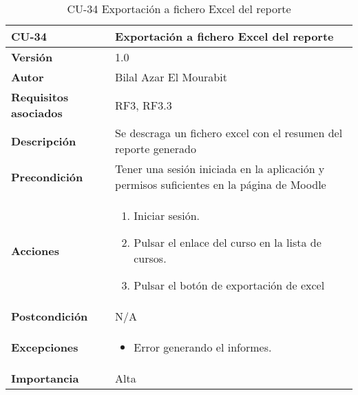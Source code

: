\begin{table}[H]
	\centering
	\begin{tabularx}{\linewidth}{ p{} p{} }
		\toprule
		\textbf{CU-34}    & \textbf{Exportación a fichero Excel del reporte}\\
		\toprule
		\textbf{Versión}              & 1.0    \\
		\textbf{Autor}                & Bilal Azar El Mourabit \\
		\textbf{Requisitos asociados} & RF3, RF3.3\\
		\textbf{Descripción}          & Se descraga un fichero excel con el resumen del reporte generado\\
    		\textbf{Precondición}         & Tener una sesión iniciada en la aplicación y permisos suficientes en la página de Moodle\\
		\textbf{Acciones}             & 
		\begin{enumerate}
			\def\labelenumi{\arabic{enumi}.}
			\tightlist
			\item Iniciar sesión.
            \item Pulsar el enlace del curso en la lista de cursos.
            \item Pulsar el botón de exportación de excel
		\end{enumerate}\\
		\textbf{Postcondición}        & N/A \\
		\textbf{Excepciones}          & \begin{itemize}
		    \item Error generando el informes.
		\end{itemize} \\
		\textbf{Importancia}          & Alta \\
		\bottomrule
	\end{tabularx}
	\caption{CU-34 Exportación a fichero Excel del reporte}
\end{table}

